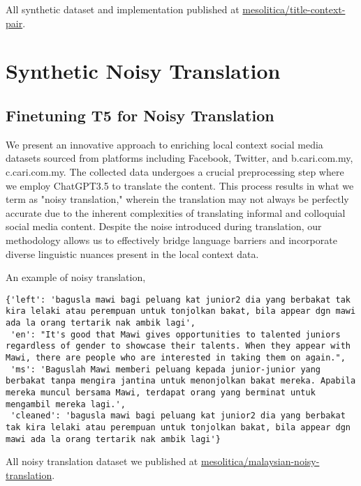 \documentclass[preprint]{article}
\begin{document}
All synthetic dataset and implementation published at \href{https://huggingface.co/datasets/mesolitica/title-context-pair}{mesolitica/title-context-pair}.

\section{Synthetic Noisy Translation}

\subsection{Finetuning T5 for Noisy Translation}

We present an innovative approach to enriching local context social media datasets sourced from platforms including Facebook, Twitter, and b.cari.com.my, c.cari.com.my. The collected data undergoes a crucial preprocessing step where we employ ChatGPT3.5 to translate the content. This process results in what we term as "noisy translation," wherein the translation may not always be perfectly accurate due to the inherent complexities of translating informal and colloquial social media content. Despite the noise introduced during translation, our methodology allows us to effectively bridge language barriers and incorporate diverse linguistic nuances present in the local context data.

An example of noisy translation,

\begin{lstlisting}[breaklines=true]
  {'left': 'bagusla mawi bagi peluang kat junior2 dia yang berbakat tak kira lelaki atau perempuan untuk tonjolkan bakat, bila appear dgn mawi ada la orang tertarik nak ambik lagi',
 'en': "It's good that Mawi gives opportunities to talented juniors regardless of gender to showcase their talents. When they appear with Mawi, there are people who are interested in taking them on again.",
 'ms': 'Baguslah Mawi memberi peluang kepada junior-junior yang berbakat tanpa mengira jantina untuk menonjolkan bakat mereka. Apabila mereka muncul bersama Mawi, terdapat orang yang berminat untuk mengambil mereka lagi.',
 'cleaned': 'bagusla mawi bagi peluang kat junior2 dia yang berbakat tak kira lelaki atau perempuan untuk tonjolkan bakat, bila appear dgn mawi ada la orang tertarik nak ambik lagi'}
\end{lstlisting}

All noisy translation dataset we published at \href{https://huggingface.co/collections/mesolitica/malaysian-noisy-translation-657e5f88e6759943575a91ac}{mesolitica/malaysian-noisy-translation}.
\end{document}
